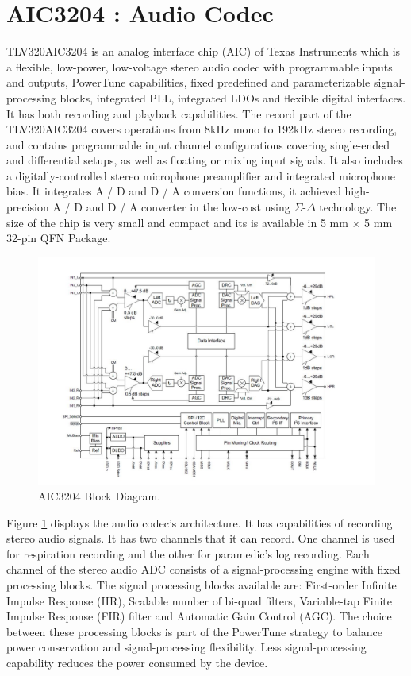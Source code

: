 \section{AIC3204 : Audio Codec}
TLV320AIC3204 is an analog interface chip (AIC) of Texas Instruments which is a flexible, low-power, low-voltage stereo audio codec with programmable inputs and outputs, PowerTune capabilities, fixed predefined and parameterizable signal-processing blocks, integrated PLL, integrated LDOs and flexible digital interfaces. It has both recording and playback capabilities. The record part of the TLV320AIC3204 covers operations from 8kHz mono to 192kHz stereo recording, and contains programmable input channel configurations covering single-ended and differential setups, as well as floating or mixing input signals. It also includes a digitally-controlled stereo microphone preamplifier and integrated microphone bias. It integrates A / D and D / A conversion functions, it achieved high-precision A / D and D / A converter in the low-cost using $\Sigma$-$\Delta$ technology. The size of the chip is very small and compact and its is available in 5 mm × 5 mm 32-pin QFN Package. 

\begin{figure}[h]
	\centering
	\includegraphics[scale = 0.7 ]{AIC3204.JPG}
	\caption{AIC3204 Block Diagram. \cite{audiocodec}\label{aic3204}}
\end{figure}

Figure \ref{aic3204} displays the audio codec's architecture. It has capabilities of recording stereo audio signals. It has two channels that it can record. One channel is used for respiration recording and the other for paramedic's log recording. Each channel of the stereo audio ADC consists of a signal-processing engine with fixed processing blocks. The signal processing blocks available are: First-order Infinite Impulse Response (IIR), Scalable number of bi-quad filters, Variable-tap Finite Impulse Response (FIR) filter and Automatic Gain Control (AGC). The choice between these processing blocks is part of the PowerTune strategy to balance power conservation and signal-processing flexibility. Less signal-processing capability reduces the power
consumed by the device.
